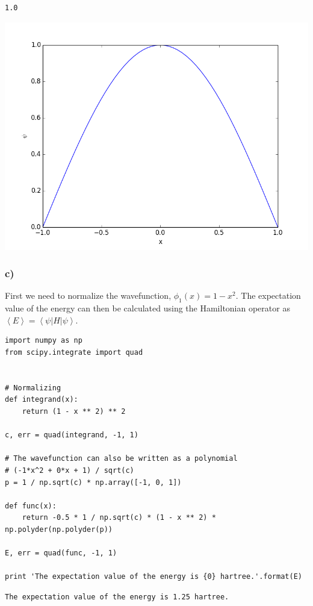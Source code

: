 \documentclass[11pt]{article}
\begin{document}
\begin{verbatim}
1.0
\end{verbatim}

\includegraphics[width=.9\linewidth]{./images/1b.png}


\subsubsection{c)}
\label{sec-1-1-3}

First we need to normalize the wavefunction, $\phi_{1}(x) = 1 - x^{2}$. The expectation value of the energy can then be calculated using the Hamiltonian operator as $\left<E\right> = \left<\psi|H|\psi\right>$.

\begin{verbatim}
import numpy as np
from scipy.integrate import quad


# Normalizing
def integrand(x):
    return (1 - x ** 2) ** 2

c, err = quad(integrand, -1, 1)

# The wavefunction can also be written as a polynomial
# (-1*x^2 + 0*x + 1) / sqrt(c)
p = 1 / np.sqrt(c) * np.array([-1, 0, 1])

def func(x):
    return -0.5 * 1 / np.sqrt(c) * (1 - x ** 2) * np.polyder(np.polyder(p))

E, err = quad(func, -1, 1)

print 'The expectation value of the energy is {0} hartree.'.format(E)
\end{verbatim}

\begin{verbatim}
The expectation value of the energy is 1.25 hartree.
\end{verbatim}
\end{document}
